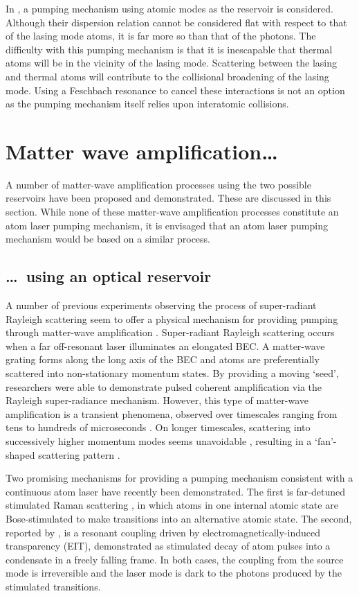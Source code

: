 In , a pumping mechanism using atomic modes as the reservoir is considered.  Although their dispersion relation cannot be considered flat with respect to that of the lasing mode atoms, it is far more so than that of the photons.  The difficulty with this pumping mechanism is that it is inescapable that thermal atoms will be in the vicinity of the lasing mode.  Scattering between the lasing and thermal atoms will contribute to the collisional broadening of the lasing mode.  Using a Feschbach resonance to cancel these interactions is not an option as the pumping mechanism itself relies upon interatomic collisions.

\section{Matter wave amplification\dots}

A number of matter-wave amplification processes using the two possible reservoirs have been proposed and demonstrated.  These are discussed in this section.  While none of these matter-wave amplification processes constitute an atom laser pumping mechanism, it is envisaged that an atom laser pumping mechanism would be based on a similar process.

\subsection{\dots\ using an optical reservoir}

A number of previous experiments observing the process of super-radiant Rayleigh scattering seem to offer a physical mechanism for providing pumping through matter-wave amplification \citep{Inouye:1999ph,Kozuma:1999pi}.  Super-radiant Rayleigh scattering occurs when a far off-resonant laser illuminates an elongated BEC.  A matter-wave grating forms along the long axis of the BEC and atoms are preferentially scattered into non-stationary momentum states.  By providing a moving `seed', researchers were able to demonstrate pulsed coherent amplification via the Rayleigh super-radiance mechanism.  However, this type of matter-wave amplification is a transient phenomena, observed over timescales ranging from tens \citep{Inouye:1999ph} to hundreds of microseconds \citep{Kozuma:1999pi}.  On longer timescales, scattering into successively higher momentum modes seems unavoidable \citep{Zobay:2006}, resulting in a `fan'-shaped scattering pattern \citep{Inouye:1999yq}.

Two promising mechanisms for providing a pumping mechanism consistent with a continuous atom laser have recently been demonstrated.  The first is far-detuned stimulated Raman scattering \citep{Schneble:2004,Yoshikawa:2004}, in which atoms in one internal atomic state are Bose-stimulated to make transitions into an alternative atomic state.  The second, reported by \citet{Ginsberg:2007fk}, is a resonant coupling driven by electromagnetically-induced transparency (EIT), demonstrated as stimulated decay of atom pulses into a condensate in a freely falling frame.  In both cases, the coupling from the source mode is irreversible and the laser mode is dark to the photons produced by the stimulated transitions.

